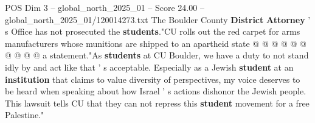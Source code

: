 \begin{textsample}{POS Dim 3 – global\_north\_2025\_01 – Score 24.00 – global\_north\_2025\_01/120014273.txt}
The Boulder County \textbf{District} \textbf{Attorney} ' s Office has not prosecuted the \textbf{students}."CU rolls out the red carpet for arms manufacturers whose munitions are shipped to an apartheid state @ @ @ @ @ @ @ @ @ @ a statement."As \textbf{students} at CU Boulder, we have a duty to not stand idly by and act like that ' s acceptable.
Especially as a Jewish \textbf{student} at an \textbf{institution} that claims to value diversity of perspectives, my voice deserves to be heard when speaking about how Israel ' s actions dishonor the Jewish people.
This lawsuit tells CU that they can not repress this \textbf{student} movement for a free Palestine."

\end{textsample}
